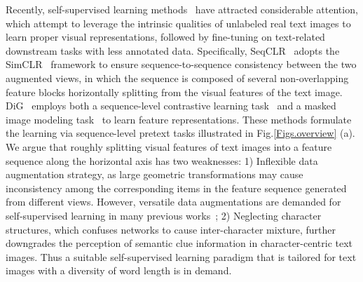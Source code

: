\documentclass[10pt,twocolumn,letterpaper]{article}
\begin{document}
Recently, self-supervised learning methods~\cite{seqCLR,DiG,Persec} have attracted considerable attention, which attempt to leverage the intrinsic qualities of unlabeled real text images to learn proper visual representations, followed by fine-tuning on text-related downstream tasks with less annotated data.
Specifically, SeqCLR~\cite{seqCLR} adopts the SimCLR~\cite{SimCLR} framework to ensure sequence-to-sequence consistency between the two augmented views, in which the sequence is composed of several non-overlapping feature blocks horizontally splitting from the visual features of the text image.
DiG~\cite{DiG} employs both a sequence-level contrastive learning task~\cite{seqCLR} and a masked image modeling task~\cite{MAE} to learn feature representations. 
These methods formulate the learning via sequence-level pretext tasks illustrated in Fig.\ref{Figs.overview} (a). We argue that roughly splitting visual features of text images into a feature sequence along the horizontal axis has two weaknesses: 
1) Inflexible data augmentation strategy, as large geometric transformations may cause inconsistency among the corresponding items in the feature sequence generated from different views. However, versatile data augmentations are demanded for self-supervised learning in many previous works~\cite{SimCLR,asano2019critical,henaff2020data};
2) Neglecting character structures, which confuses networks to cause inter-character mixture, further downgrades the perception of semantic clue information in character-centric text images.
Thus a suitable self-supervised learning paradigm that is tailored for text images with a diversity of word length is in demand.
\end{document}
